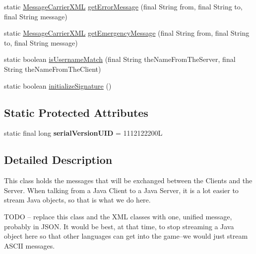 \begin{DoxyCompactItemize}
\item 
static \hyperlink{classgov_1_1fnal_1_1ppd_1_1dd_1_1xml_1_1MessageCarrierXML}{Message\-Carrier\-X\-M\-L} \hyperlink{classgov_1_1fnal_1_1ppd_1_1dd_1_1xml_1_1MessageCarrierXML_a5159aef548c8c4fe564adc7d7d622305}{get\-Error\-Message} (final String from, final String to, final String message)
\item 
static \hyperlink{classgov_1_1fnal_1_1ppd_1_1dd_1_1xml_1_1MessageCarrierXML}{Message\-Carrier\-X\-M\-L} \hyperlink{classgov_1_1fnal_1_1ppd_1_1dd_1_1xml_1_1MessageCarrierXML_ae0ff176bc80254ed8630c57498a60a36}{get\-Emergency\-Message} (final String from, final String to, final String message)
\item 
static boolean \hyperlink{classgov_1_1fnal_1_1ppd_1_1dd_1_1xml_1_1MessageCarrierXML_a04d65b843d37b0e9f2e8026ec00b95ff}{is\-Username\-Match} (final String the\-Name\-From\-The\-Server, final String the\-Name\-From\-The\-Client)
\item 
static boolean \hyperlink{classgov_1_1fnal_1_1ppd_1_1dd_1_1xml_1_1MessageCarrierXML_ac40b23845fe4cc4db344d35f583b2cd6}{initialize\-Signature} ()
\end{DoxyCompactItemize}
\subsection*{Static Protected Attributes}
\begin{DoxyCompactItemize}
\item 
\hypertarget{classgov_1_1fnal_1_1ppd_1_1dd_1_1xml_1_1MessageCarrierXML_addbf53e6678de784e9f2f7a4804c48cf}{static final long {\bfseries serial\-Version\-U\-I\-D} = 1112122200\-L}\label{classgov_1_1fnal_1_1ppd_1_1dd_1_1xml_1_1MessageCarrierXML_addbf53e6678de784e9f2f7a4804c48cf}

\end{DoxyCompactItemize}


\subsection{Detailed Description}
This class holds the messages that will be exchanged between the Clients and the Server. When talking from a Java Client to a Java Server, it is a lot easier to stream Java objects, so that is what we do here.

T\-O\-D\-O -- replace this class and the X\-M\-L classes with one, unified message, probably in J\-S\-O\-N. It would be best, at that time, to stop streaming a Java object here so that other languages can get into the game--we would just stream A\-S\-C\-I\-I messages.

